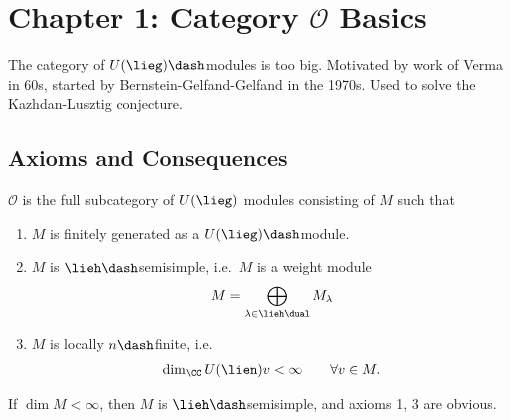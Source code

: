 \hypertarget{chapter-1-category-mathcal-o-basics}{%
\section{\texorpdfstring{Chapter 1: Category \(\mathcal O\)
Basics}{Chapter 1: Category \textbackslash mathcal O Basics}}\label{chapter-1-category-mathcal-o-basics}}

The category of \(U(\lieg)\dash\)modules is too big. Motivated by work
of Verma in 60s, started by Bernstein-Gelfand-Gelfand in the 1970s. Used
to solve the Kazhdan-Lusztig conjecture.

\hypertarget{axioms-and-consequences}{%
\subsection{Axioms and Consequences}\label{axioms-and-consequences}}

\begin{definition}[Category $\OO$]

\(\mathcal O\) is the full subcategory of \(U(\lieg)\) modules
consisting of \(M\) such that

\begin{enumerate}
\def\labelenumi{\arabic{enumi}.}
\tightlist
\item
  \(M\) is finitely generated as a \(U(\lieg)\dash\)module.
\item
  \(M\) is \(\lieh\dash\)semisimple, i.e.~\(M\) is a weight module
  \begin{align*}
  M = \bigoplus_{\lambda \in \lieh\dual} M_\lambda
  \end{align*}
\item
  \(M\) is locally \(n\dash\)finite, i.e.~
  \begin{align*}  
  \dim_\CC U(\lien) v < \infty \qquad \forall v\in M
  .\end{align*}
\end{enumerate}

\end{definition}

\begin{example}[?]

If \(\dim M < \infty\), then \(M\) is \(\lieh\dash\)semisimple, and
axioms 1, 3 are obvious.

\end{example}

